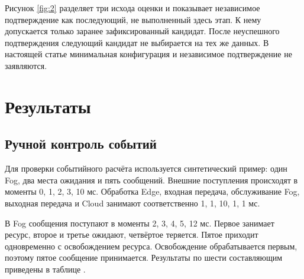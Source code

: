 Рисунок \ref{fig:2} разделяет три исхода оценки и показывает независимое подтверждение как последующий, не выполненный здесь этап. К нему допускается только заранее зафиксированный кандидат. После неуспешного подтверждения следующий кандидат не выбирается на тех же данных. В настоящей статье минимальная конфигурация и независимое подтверждение не заявляются.

\hypertarget{ux440ux435ux437ux443ux43bux44cux442ux430ux442ux44b}{%
\FloatBarrier
\section{Результаты}}

\hypertarget{ux440ux443ux447ux43dux43eux439-ux43aux43eux43dux442ux440ux43eux43bux44c-ux441ux43eux431ux44bux442ux438ux439}{%
\subsection{Ручной контроль событий}}

Для проверки событийного расчёта используется синтетический пример: один Fog, два места ожидания и пять сообщений. Внешние поступления происходят в моменты 0, 1, 2, 3, 10 мс. Обработка Edge, входная передача, обслуживание Fog, выходная передача и Cloud занимают соответственно 1, 1, 10, 1, 1 мс.

В Fog сообщения поступают в моменты 2, 3, 4, 5, 12 мс. Первое занимает ресурс, второе и третье ожидают, четвёртое теряется. Пятое приходит одновременно с освобождением ресурса. Освобождение обрабатывается первым, поэтому пятое сообщение принимается. Результаты по шести составляющим приведены в таблице \hyperlink{fefc-tab:2}{}.


